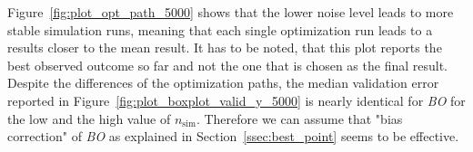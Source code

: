 \documentclass[bimj,fleqn]{w-art}
\theoremstyle{plain}
\theoremstyle{definition}
\begin{document}
Figure~\ref{fig:plot_opt_path_5000} shows that the lower noise level leads to more stable simulation runs, meaning that each single optimization run leads to a results closer to the mean result.
It has to be noted, that this plot reports the best observed outcome so far and not the one that is chosen as the final result.
Despite the differences of the optimization paths, the median validation error reported in Figure~\ref{fig:plot_boxplot_valid_y_5000} is nearly identical for \emph{BO} for the low and the high value of $n_\text{sim}$.
Therefore we can assume that "bias correction" of \emph{BO} as explained in Section~\ref{ssec:best_point} seems to be effective.
\end{document}
